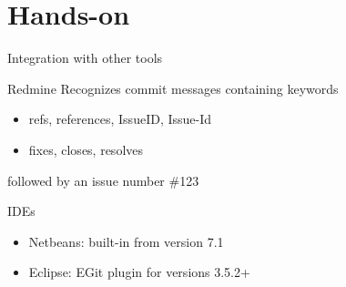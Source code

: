\documentclass{beamer}
\begin{document}
\section{Hands-on}

\begin{frame}{Integration with other tools}
  \begin{block}{Redmine}
    Recognizes commit messages containing keywords
    \begin{itemize}
    \item refs, references, IssueID, Issue-Id
    \item fixes, closes, resolves
    \end{itemize}
    followed by an issue number \#123
  \end{block}
  \begin{block}{IDEs}
    \begin{itemize}
    \item Netbeans: built-in from version 7.1
    \item Eclipse: EGit plugin for versions 3.5.2+
    \end{itemize}
  \end{block}
\end{frame}
\end{document}
